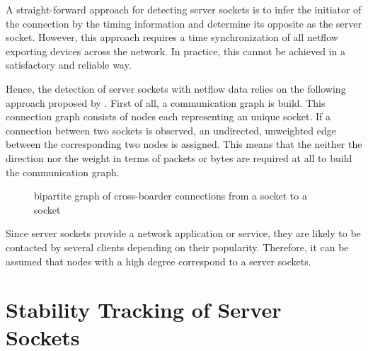 A straight-forward approach for detecting server sockets is to infer the initiator of the connection by the timing information and determine its opposite as the server socket. However, this approach requires a  time synchronization of all netflow exporting devices across the network. In practice, this cannot be achieved in a satisfactory and reliable way.


Hence, the detection of server sockets with netflow data relies on the following approach proposed by \citet{Schatzmann:Mining,Schatzmann:Dissection, Schatzmann:Tracing}. First of all, a communication graph is build. This connection graph consists of nodes each representing an unique socket. If a connection between two sockets is observed, an undirected, unweighted edge between the corresponding two nodes is assigned. This means that the neither the direction nor the weight in terms of packets or bytes are required at all to build the communication graph. 

\begin{figure}[ht]
\centering 
{}
\caption{bipartite graph of cross-boarder connections from a socket to a socket}
\label{fig:bipartite_graph}
\end{figure}

Since server sockets provide a network application or service, they are likely to be contacted by several clients depending on their popularity. Therefore, it can be assumed that nodes with a high degree correspond to a server sockets.



\section{Stability Tracking of Server Sockets\label{section:socket_tracking}}

